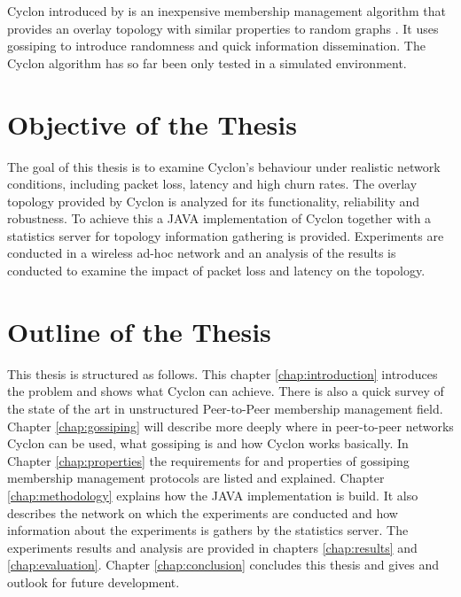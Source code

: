Cyclon introduced by \cite{voulgaris2005cyclon} is an inexpensive membership
management algorithm that provides an overlay topology with similar properties
to random graphs \cite{Bollobas1985}. It uses gossiping to introduce randomness
and quick information dissemination. The Cyclon algorithm has so far been only
tested in a simulated environment.

\section{Objective of the Thesis} 
The goal of this thesis is to examine Cyclon's behaviour under realistic
network conditions, including packet loss, latency and high churn rates. The
overlay topology provided by Cyclon is analyzed for its functionality,
reliability and robustness. To achieve this a JAVA implementation of Cyclon
together with a statistics server for topology information gathering is
provided. Experiments are conducted in a wireless ad-hoc network and an
analysis of the results is conducted to examine the impact of packet loss and
latency on the topology. 

 \section{Outline of the Thesis} %
This thesis is structured as follows. This chapter \ref{chap:introduction}
introduces the problem and shows what Cyclon can achieve. There is also a quick
survey of the state of the art in unstructured Peer-to-Peer membership
management field. Chapter \ref{chap:gossiping} will describe more deeply where
in peer-to-peer networks Cyclon can be used, what gossiping is and how Cyclon
works basically. In Chapter \ref{chap:properties} the requirements for and
properties of gossiping membership management protocols are listed and
explained. Chapter \ref{chap:methodology} explains how the JAVA implementation
is build. It also describes the network on which the experiments are conducted
and how information about the experiments is gathers by the statistics server.
The experiments results and analysis are provided in chapters \ref{chap:results}
and \ref{chap:evaluation}. Chapter \ref{chap:conclusion} concludes this thesis
and gives and outlook for future development.

